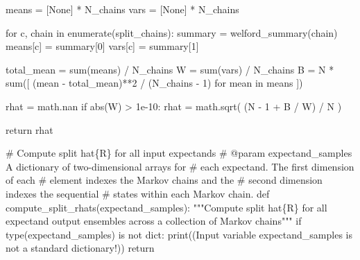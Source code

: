 \documentclass[
  letterpaper,
  DIV=11,
  numbers=noendperiod]{scrartcl}
\newenvironment{Shaded}{\begin{snugshade}}{\end{snugshade}}
\newcommand{\BuiltInTok}[1]{\textcolor[rgb]{0.00,0.23,0.31}{#1}}
\newcommand{\CommentTok}[1]{\textcolor[rgb]{0.37,0.37,0.37}{#1}}
\newcommand{\ControlFlowTok}[1]{\textcolor[rgb]{0.00,0.23,0.31}{#1}}
\newcommand{\DecValTok}[1]{\textcolor[rgb]{0.68,0.00,0.00}{#1}}
\newcommand{\FloatTok}[1]{\textcolor[rgb]{0.68,0.00,0.00}{#1}}
\newcommand{\KeywordTok}[1]{\textcolor[rgb]{0.00,0.23,0.31}{#1}}
\newcommand{\NormalTok}[1]{\textcolor[rgb]{0.00,0.23,0.31}{#1}}
\newcommand{\OperatorTok}[1]{\textcolor[rgb]{0.37,0.37,0.37}{#1}}
\newcommand{\StringTok}[1]{\textcolor[rgb]{0.13,0.47,0.30}{#1}}
\newcommand{\VariableTok}[1]{\textcolor[rgb]{0.07,0.07,0.07}{#1}}
\begin{document}
\begin{Shaded}
\begin{Highlighting}[]
\NormalTok{  means }\OperatorTok{=}\NormalTok{ [}\VariableTok{None}\NormalTok{] }\OperatorTok{*}\NormalTok{ N\_chains}
  \BuiltInTok{vars} \OperatorTok{=}\NormalTok{ [}\VariableTok{None}\NormalTok{] }\OperatorTok{*}\NormalTok{ N\_chains}
  
  \ControlFlowTok{for}\NormalTok{ c, chain }\KeywordTok{in} \BuiltInTok{enumerate}\NormalTok{(split\_chains):}
\NormalTok{    summary }\OperatorTok{=}\NormalTok{ welford\_summary(chain)}
\NormalTok{    means[c] }\OperatorTok{=}\NormalTok{ summary[}\DecValTok{0}\NormalTok{]}
    \BuiltInTok{vars}\NormalTok{[c] }\OperatorTok{=}\NormalTok{ summary[}\DecValTok{1}\NormalTok{]}
  
\NormalTok{  total\_mean }\OperatorTok{=} \BuiltInTok{sum}\NormalTok{(means) }\OperatorTok{/}\NormalTok{ N\_chains}
\NormalTok{  W }\OperatorTok{=} \BuiltInTok{sum}\NormalTok{(}\BuiltInTok{vars}\NormalTok{) }\OperatorTok{/}\NormalTok{ N\_chains}
\NormalTok{  B }\OperatorTok{=}\NormalTok{ N }\OperatorTok{*} \BuiltInTok{sum}\NormalTok{([ (mean }\OperatorTok{{-}}\NormalTok{ total\_mean)}\OperatorTok{**}\DecValTok{2} \OperatorTok{/}\NormalTok{ (N\_chains }\OperatorTok{{-}} \DecValTok{1}\NormalTok{) }
                \ControlFlowTok{for}\NormalTok{ mean }\KeywordTok{in}\NormalTok{ means ])}
  
\NormalTok{  rhat }\OperatorTok{=}\NormalTok{ math.nan}
  \ControlFlowTok{if} \BuiltInTok{abs}\NormalTok{(W) }\OperatorTok{\textgreater{}} \FloatTok{1e{-}10}\NormalTok{:}
\NormalTok{    rhat }\OperatorTok{=}\NormalTok{ math.sqrt( (N }\OperatorTok{{-}} \DecValTok{1} \OperatorTok{+}\NormalTok{ B }\OperatorTok{/}\NormalTok{ W) }\OperatorTok{/}\NormalTok{ N )}
  
  \ControlFlowTok{return}\NormalTok{ rhat}

\CommentTok{\# Compute split hat\{R\} for all input expectands}
\CommentTok{\# @param expectand\_samples A dictionary of two{-}dimensional arrays for }
\CommentTok{\#                          each expectand.  The first dimension of each}
\CommentTok{\#                          element indexes the Markov chains and the }
\CommentTok{\#                          second dimension indexes the sequential }
\CommentTok{\#                          states within each Markov chain.}
\KeywordTok{def}\NormalTok{ compute\_split\_rhats(expectand\_samples):}
  \CommentTok{"""Compute split hat\{R\} for all expectand output ensembles across}
\CommentTok{     a collection of Markov chains"""}
  \ControlFlowTok{if} \BuiltInTok{type}\NormalTok{(expectand\_samples) }\KeywordTok{is} \KeywordTok{not} \BuiltInTok{dict}\NormalTok{:}
    \BuiltInTok{print}\NormalTok{((}\StringTok{\textquotesingle{}Input variable \textasciigrave{}expectand\_samples\textasciigrave{} \textquotesingle{}}
           \StringTok{\textquotesingle{}is not a standard dictionary!\textquotesingle{}}\NormalTok{))}
    \ControlFlowTok{return}
    

\end{Highlighting}
\end{Shaded}
\end{document}
